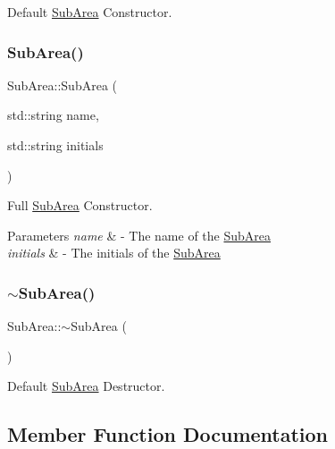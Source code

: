 Default \mbox{\hyperlink{classSubArea}{Sub\+Area}} Constructor. 

\mbox{\label{classSubArea_a27e357e4c5765eb3128fdde5cdf690e3}} 
\subsubsection{\texorpdfstring{Sub\+Area()}{SubArea()}\hspace{0.1cm}{\footnotesize\ttfamily [2/2]}}
{\footnotesize\ttfamily Sub\+Area\+::\+Sub\+Area (\begin{DoxyParamCaption}\item[{std\+::string}]{name,  }\item[{std\+::string}]{initials }\end{DoxyParamCaption})}



Full \mbox{\hyperlink{classSubArea}{Sub\+Area}} Constructor. 


\begin{DoxyParams}{Parameters}
{\em name} & -\/ The name of the \mbox{\hyperlink{classSubArea}{Sub\+Area}} \\
\hline
{\em initials} & -\/ The initials of the \mbox{\hyperlink{classSubArea}{Sub\+Area}} \\
\hline
\end{DoxyParams}
\mbox{\label{classSubArea_a0423d8d6d9f297cc1ceff557279d9be8}} 
\subsubsection{\texorpdfstring{$\sim$\+Sub\+Area()}{~SubArea()}}
{\footnotesize\ttfamily Sub\+Area\+::$\sim$\+Sub\+Area (\begin{DoxyParamCaption}{ }\end{DoxyParamCaption})\hspace{0.3cm}{\ttfamily [virtual]}}



Default \mbox{\hyperlink{classSubArea}{Sub\+Area}} Destructor. 



\subsection{Member Function Documentation}
\mbox{\label{classSubArea_a0385787547e85f2481bc0031e6c98f10}} 
